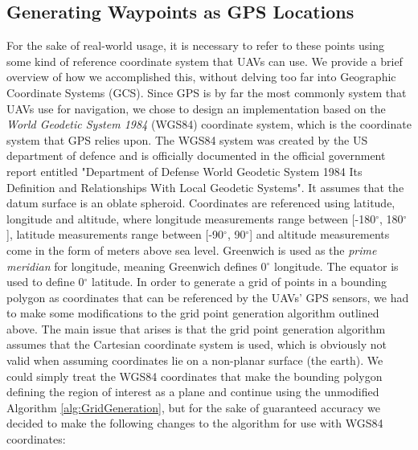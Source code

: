 



\subsection{Generating Waypoints as GPS Locations}
For the sake of real-world usage, it is necessary to refer to these points using some kind of reference coordinate system that UAVs can use. We provide a brief overview of how we accomplished this, without delving too far into Geographic Coordinate Systems (GCS). Since GPS is by far the most commonly system that UAVs use for navigation, we chose to design an implementation based on the \textit{World Geodetic System 1984} (WGS84) coordinate system, which is the coordinate system that GPS relies upon. The WGS84 system was created by the US department of defence and is officially documented in the official government report entitled "Department of Defense World Geodetic System 1984 Its Definition and Relationships With Local Geodetic Systems". It assumes that the datum surface is an oblate spheroid.
Coordinates are referenced using latitude, longitude and altitude, where longitude measurements range between [-180$^{\circ}$, 180$^{\circ}$], latitude measurements range between [-90$^{\circ}$, 90$^{\circ}$] and altitude measurements come in the form of meters above sea level. Greenwich is used as the \textit{prime meridian} for longitude, meaning Greenwich defines 0$^{\circ}$ longitude. The equator is used to define 0$^{\circ}$ latitude. In order to generate a grid of points in a bounding polygon as coordinates that can be referenced by the UAVs' GPS sensors, we had to make some modifications to the grid point generation algorithm outlined above. The main issue that arises is that the grid point generation algorithm assumes that the Cartesian coordinate system is used, which is obviously not valid when assuming coordinates lie on a  non-planar surface (the earth). We could simply treat the WGS84 coordinates that make the bounding polygon defining the region of interest as a plane and continue using the unmodified Algorithm \ref{alg:GridGeneration}, but for the sake of guaranteed accuracy we decided to make the following changes to the algorithm for use with WGS84 coordinates:
